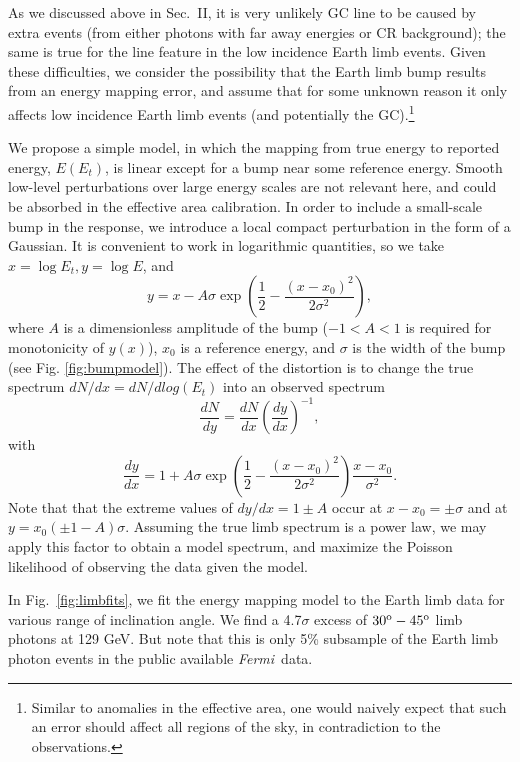 \documentclass[aps,twocolumn,prd,superscriptaddress,showpacs,nofootinbib,fixfloat]{revtex4}
\newcommand{\be}{\begin{equation}}
\newcommand{\ee}{\end{equation}}
\newcommand{\Fermi}{{\slshape Fermi}}
\newcommand{\degree}{^{\rm o}}
\begin{document}
As we discussed above in Sec.~II, it is very unlikely %
GC line to be caused by extra events (from either photons with far away
energies or CR background); the same is true for the line feature in the low
incidence Earth limb events.  Given these difficulties, we consider the
possibility that the Earth limb bump results from an energy mapping error, and
assume that for some unknown reason it only affects low incidence Earth limb
events (and potentially the GC).\footnote{Similar to anomalies in the
effective area, one would naively expect that such an error should affect all
regions of the sky, in contradiction to the observations.}

We propose a simple model, in
which the mapping from true energy to reported energy,
$E(E_t)$, is linear except for a bump near some reference
energy.  Smooth low-level perturbations over large energy
scales are not relevant here, and could be absorbed in the
effective area calibration.  In order to include a
small-scale bump in the response, we introduce a local
compact perturbation in the form of a Gaussian.  It is
convenient to work in logarithmic quantities, so we take
$x=\log E_t, y=\log E$, and \be
\label{eq:yofx}
y=x - A\sigma \exp\left(\frac{1}{2}-\frac{(x-x_0)^2}{2\sigma^2}\right),
\ee
where $A$ is a dimensionless amplitude of the bump ($-1<A<1$
is required for monotonicity of $y(x)$), $x_0$ is a
reference energy, and $\sigma$ is the width of the bump (see
Fig. \ref{fig:bumpmodel}).  The effect of the distortion is
to change the true spectrum $dN/dx = dN/dlog(E_t)$ into an
observed spectrum
\be
\label{eq:dndy}
\frac{dN}{dy} = \frac{dN}{dx} \left(\frac{dy}{dx}\right)^{-1} ,
\ee
with
\be
\label{eq:dydx}
\frac{dy}{dx} = 1 + A\sigma \exp\left(\frac{1}{2}-\frac{(x-x_0)^2}{2\sigma^2}\right)
\frac{x-x_0}{\sigma^2}.
\ee
Note that that the extreme values of $dy/dx = 1 \pm A$ occur
at $x-x_0 = \pm \sigma$ and at $y=x_0(\pm1-A)\sigma$.
Assuming the true limb spectrum is a power law, we may apply
this factor to obtain a model spectrum, and maximize the
Poisson likelihood of observing the data given the model.


In Fig.~\ref{fig:limbfits}, we fit the energy mapping model
to the Earth limb data for various range of inclination
angle. We find a 4.7$\sigma$ excess of $30\degree-45\degree$
limb photons at 129 GeV. But note that this is only 5\% subsample of the Earth limb photon events in the public available \Fermi\ data.
\end{document}
